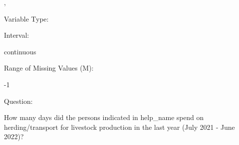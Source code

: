 \documentclass[
]{article}
\begin{document}
,

\begin{minipage}[t]{0.3\linewidth}

\colorbox{mypink1}{}

\end{minipage}%
\begin{minipage}[t]{0.7\linewidth}

\colorbox{mypink1}{\makebox[\textwidth]{\strut\bfseries\color{black}  
 }}

\end{minipage}

\begin{minipage}[t]{0.3\linewidth}

Variable Type:

\end{minipage}%
\begin{minipage}[t]{0.7\linewidth}

\end{minipage}

\begin{minipage}[t]{0.3\linewidth}

Interval:

\end{minipage}%
\begin{minipage}[t]{0.7\linewidth}

continuous

\end{minipage}

\begin{minipage}[t]{0.3\linewidth}

Range of Missing Values (M):

\end{minipage}%
\begin{minipage}[t]{0.7\linewidth}

-1

\end{minipage}

\begin{minipage}[t]{0.3\linewidth}

Question:

\end{minipage}%
\begin{minipage}[t]{0.7\linewidth}

How many days did the persons indicated in help\_name spend on
herding/transport for livestock production in the last year (July 2021 -
June 2022)?

\end{minipage}
\end{document}
